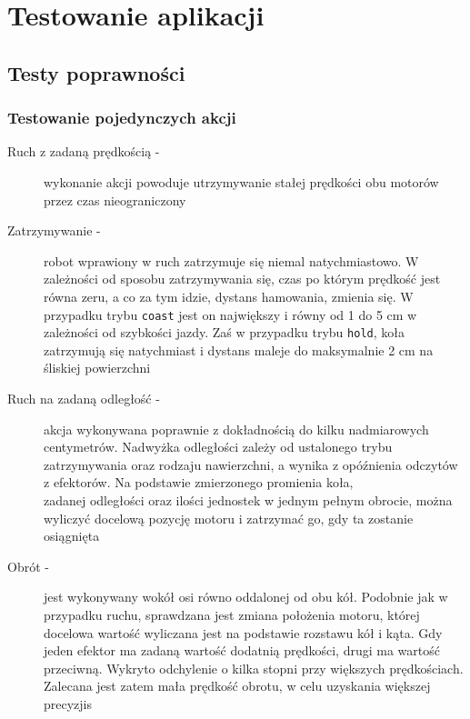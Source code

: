 \chapter{Testowanie aplikacji}
\label{ch:testowanie}

\section{Testy poprawności}


\subsection{Testowanie pojedynczych akcji}

\begin{description}
    \item[Ruch z zadaną prędkością -]wykonanie akcji powoduje utrzymywanie stałej prędkości obu motorów przez czas nieograniczony
    \item[Zatrzymywanie -]robot wprawiony w ruch zatrzymuje się niemal natychmiastowo. W zależności od sposobu zatrzymywania się, czas po którym prędkość jest równa zeru, a co za tym idzie, dystans hamowania, zmienia się. W przypadku trybu {\tt coast} jest on największy i równy od 1 do 5 cm w zależności od szybkości jazdy. Zaś w przypadku trybu {\tt hold}, koła zatrzymują się natychmiast i dystans maleje do maksymalnie 2 cm na śliskiej powierzchni
    \item[Ruch na zadaną odległość -]akcja wykonywana poprawnie z dokładnością do kilku nadmiarowych centymetrów. Nadwyżka odległości zależy od ustalonego trybu zatrzymywania oraz rodzaju nawierzchni, a wynika z opóźnienia odczytów z efektorów. Na podstawie zmierzonego promienia koła,\\zadanej odległości oraz ilości jednostek w jednym pełnym obrocie, można wyliczyć docelową pozycję motoru i zatrzymać go, gdy ta zostanie osiągnięta
    \item[Obrót -]jest wykonywany wokół osi równo oddalonej od obu kół. Podobnie jak w przypadku ruchu, sprawdzana jest zmiana położenia motoru, której docelowa wartość wyliczana jest na podstawie rozstawu kół i kąta. Gdy jeden efektor ma zadaną wartość dodatnią prędkości, drugi ma wartość przeciwną. Wykryto odchylenie o kilka stopni przy większych prędkościach. Zalecana jest zatem mała prędkość obrotu, w celu uzyskania większej precyzjis

\end{description}

